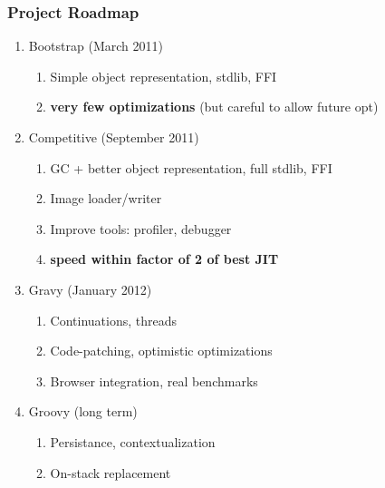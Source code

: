 \begin{frame}
\frametitle{\bf Project Roadmap}
    \begin{enumerate}[1.]

        \item Bootstrap (March 2011)
        \begin{enumerate}[1.]
            \item Simple object representation, stdlib, FFI
            \item {\bf very few optimizations} (but careful to allow future opt)
        \end{enumerate}

        \item Competitive (September 2011)
        \begin{enumerate}[1.]
            \item GC + better object representation, full stdlib, FFI
            \item Image loader/writer
            \item Improve tools: profiler, debugger
            \item {\bf speed within factor of 2 of best JIT}
        \end{enumerate}

        \item Gravy (January 2012)
        \begin{enumerate}[1.]
            \item Continuations, threads
            \item Code-patching, optimistic optimizations
            \item Browser integration, real benchmarks
        \end{enumerate}

        \item Groovy (long term)
        \begin{enumerate}[1.]
            \item Persistance, contextualization
            \item On-stack replacement
        \end{enumerate}
    \end{enumerate}
\end{frame}
